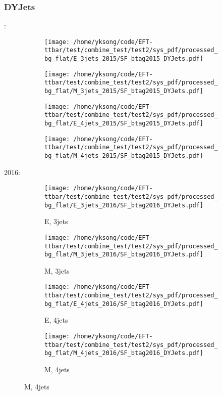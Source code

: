 \documentclass{beamer}
\begin{document}
\begin{frame}
\frametitle{DYJets}
\fontsize{5}{1}:
\begin{figure}
\centering
\begin{subfigure}[b]{0.24\textwidth}
\texttt{[image: /home/yksong/code/EFT-ttbar/test/combine\_test/test2/sys\_pdf/processed\_bg\_flat/E\_3jets\_2015/SF\_btag2015\_DYJets.pdf]}
\end{subfigure}
\begin{subfigure}[b]{0.24\textwidth}
\texttt{[image: /home/yksong/code/EFT-ttbar/test/combine\_test/test2/sys\_pdf/processed\_bg\_flat/M\_3jets\_2015/SF\_btag2015\_DYJets.pdf]}
\end{subfigure}
\begin{subfigure}[b]{0.24\textwidth}
\texttt{[image: /home/yksong/code/EFT-ttbar/test/combine\_test/test2/sys\_pdf/processed\_bg\_flat/E\_4jets\_2015/SF\_btag2015\_DYJets.pdf]}
\end{subfigure}
\begin{subfigure}[b]{0.24\textwidth}
\texttt{[image: /home/yksong/code/EFT-ttbar/test/combine\_test/test2/sys\_pdf/processed\_bg\_flat/M\_4jets\_2015/SF\_btag2015\_DYJets.pdf]}
\end{subfigure}
\end{figure}
2016:
\begin{figure}
\centering
\begin{subfigure}[b]{0.24\textwidth}
\texttt{[image: /home/yksong/code/EFT-ttbar/test/combine\_test/test2/sys\_pdf/processed\_bg\_flat/E\_3jets\_2016/SF\_btag2016\_DYJets.pdf]}
\captionsetup{font=tiny}
\caption{E, 3jets}
\end{subfigure}
\begin{subfigure}[b]{0.24\textwidth}
\texttt{[image: /home/yksong/code/EFT-ttbar/test/combine\_test/test2/sys\_pdf/processed\_bg\_flat/M\_3jets\_2016/SF\_btag2016\_DYJets.pdf]}
\captionsetup{font=tiny}
\caption{M, 3jets}
\end{subfigure}
\begin{subfigure}[b]{0.24\textwidth}
\texttt{[image: /home/yksong/code/EFT-ttbar/test/combine\_test/test2/sys\_pdf/processed\_bg\_flat/E\_4jets\_2016/SF\_btag2016\_DYJets.pdf]}
\captionsetup{font=tiny}
\caption{E, 4jets}
\end{subfigure}
\begin{subfigure}[b]{0.24\textwidth}
\texttt{[image: /home/yksong/code/EFT-ttbar/test/combine\_test/test2/sys\_pdf/processed\_bg\_flat/M\_4jets\_2016/SF\_btag2016\_DYJets.pdf]}
\captionsetup{font=tiny}
\caption{M, 4jets}
\end{subfigure}
\end{figure}
\end{frame}
\end{document}
